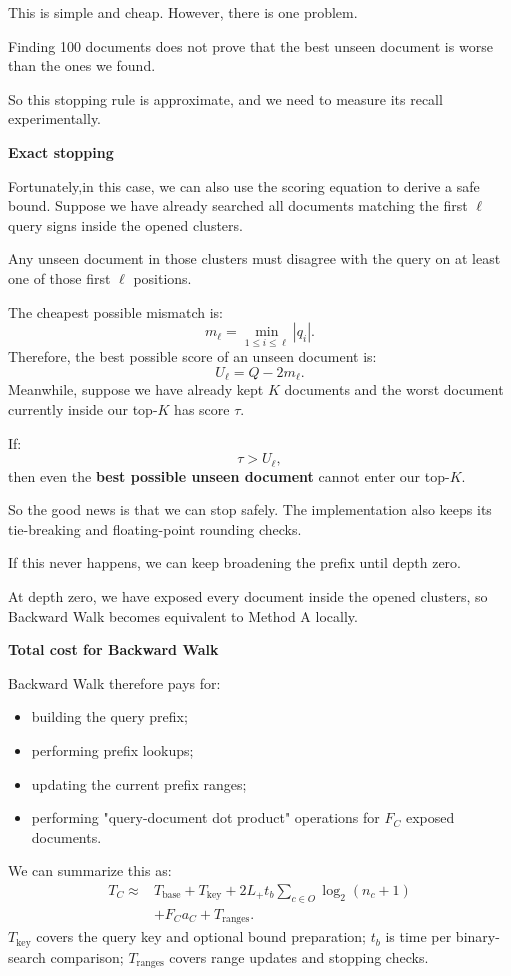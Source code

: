 This is simple and cheap. However, there is one problem.

Finding 100 documents does not prove that the best unseen document is worse than the ones we found.

So this stopping rule is approximate, and we need to measure its recall experimentally.

\textbf{Exact stopping}\par
Fortunately,in this case, we can also use the scoring equation to derive a safe bound. Suppose we have already searched all documents matching the first $\ell$ query signs inside the opened clusters.

Any unseen document in those clusters must disagree with the query on at least one of those first $\ell$ positions.

The cheapest possible mismatch is:
\[
m_\ell=\min_{1\le i\le\ell}|q_i|.
\]
Therefore, the best possible score of an unseen document is:
\[
U_\ell=Q-2m_\ell.
\]
Meanwhile, suppose we have already kept $K$ documents and the worst document currently inside our top-$K$ has score $\tau$.

If:
\[
\tau>U_\ell,
\]
then even the \textbf{best possible unseen document} cannot enter our top-$K$.

So the good news is that we can stop safely. The implementation also keeps its tie-breaking and floating-point rounding checks.

If this never happens, we can keep broadening the prefix until depth zero.

At depth zero, we have exposed every document inside the opened clusters, so Backward Walk becomes equivalent to Method A locally.

\textbf{Total cost for Backward Walk}\par
Backward Walk therefore pays for:
\begin{itemize}\setlength{\itemsep}{1pt}
\item building the query prefix;
\item performing prefix lookups;
\item updating the current prefix ranges;
\item performing "query-document dot product" operations for $F_C$ exposed documents.
\end{itemize}
We can summarize this as:
\[
\begin{aligned}
T_C\approx{}&T_{\text{base}}+T_{\text{key}}
+2L_+t_b\sum_{c\in O}\log_2(n_c+1)\\
&+F_Ca_C+T_{\text{ranges}}.
\end{aligned}
\]
$T_{\text{key}}$ covers the query key and optional bound preparation; $t_b$ is time per binary-search comparison; $T_{\text{ranges}}$ covers range updates and stopping checks.


